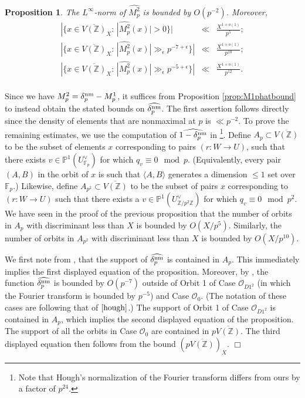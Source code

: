 \documentclass{article}
\def\Z{{\mathbb Z}}
\def\P{{\mathbb P}}
\def\nm{{\rm nm}}
\def\cO{{\mathcal O}}
\def\F{{\mathbb F}}
\def\Z{{\mathbb Z}}
\def\P{{\mathbb P}}
\def\F{{\mathbb F}}
\def\ol{\overline}
\newtheorem{proposition}[theorem]{Proposition}
\newenvironment{proof}{\noindent {\bf Proof:}}{$\Box$ \vspace{2 ex}}
\begin{document}
\begin{proposition}\label{prop:M2phatbound}
The $L^\infty$-norm of $\widehat{M_p^2}$ is bounded by $O(p^{-2})$. Moreover,
\begin{equation*}
\begin{array}{rcl}
|\{x\in\ol{V(\Z)}_X:\,|\widehat{M_p^2}(x)|>0\}|
&\ll& \displaystyle\frac{X^{1+o(1)}}{p^{5}}; \\[.15in]
|\{x\in\ol{V(\Z)}_X:\,|\widehat{M_p^2}(x)|\gg_\epsilon p^{-7+\epsilon}\}|
&\ll& \displaystyle\frac{X^{1+o(1)}}{p^{10}}; \\[.15in]
|\{x\in\ol{V(\Z)}_X:\,|\widehat{M_p^2}(x)|\gg_\epsilon p^{-5+\epsilon}\}|
&\ll& \displaystyle\frac{X^{1+o(1)}}{p^{12}}. \\[.15in]
\end{array}
\end{equation*}    
\end{proposition}
\begin{proof}
Since we have $M_p^2=\delta^{\nm}_p-M_p^1$, it suffices from Proposition \ref{prop:M1phatbound} to instead obtain the stated bounds on $\widehat{\delta^{\nm}_p}$. The first assertion follows directly since the density of elements that are nonmaximal at $p$ is $\ll p^{-2}$.
To prove the remaining estimates, we use the computation of $\widehat{1-\delta^{\nm}_p}$ in \cite[Theorem 2]{hough}\footnote{Note that Hough's normalization of the Fourier transform differs from ours by a factor of $p^{24}$.}.
Define $A_p\subset \ol{V(\Z)}$ to be the subset of elements $x$ corresponding to pairs $(r:W\to U)$, such that there exists $v\in \P^1(U^{\vee}_{\F_p})$ for which $q_v\equiv 0\mod p$. (Equivalently, every pair $(A,B)$ in the orbit of $x$ is such that $\langle A,B\rangle$ generates a dimension $\leq 1$ set over $\F_p$.) Likewise, define $A_{p^2}\subset \ol{V(\Z)}$ to be the subset of pairs $x$ corresponding to $(r:W\to U)$ such that there exists a $v\in \P^1(U^{\vee}_{\Z/p^2\Z})$ for which $q_v\equiv 0\mod p^2$. We have seen in the proof of the previous proposition that the number of orbits in $A_p$ with discriminant less than $X$ is bounded by $O(X/p^5)$. Similarly, the number of orbits in $A_{p^2}$ with discriminant less than $X$ is bounded by $O(X/p^{10})$.

We first note from \cite[Theorem 2]{hough}, that 
the support of $\widehat{\delta^{\nm}_p}$ is contained in $A_p$. This immediately implies the first displayed equation of the proposition. Moreover, by \cite[Theorem 2]{hough}, the function $\widehat{\delta^{\nm}_p}$ is bounded by $O(p^{-7})$ outside of Orbit 1 of Case $\cO_{D1^2}$ (in which the Fourier transform is bounded by $p^{-5}$) and Case $\cO_0$. (The notation of these cases are following that of $\cite{hough}$.) The support of Orbit 1 of Case $\cO_{D1^2}$ is contained in $A_p$, which implies the second displayed equation of the proposition. The support of all the orbits in Case $\cO_0$ are contained in $p\ol{V(\Z)}$. The third displayed equation then follows from the bound $(p\ol{V(\Z)})_X$.
\end{proof}
\end{document}
